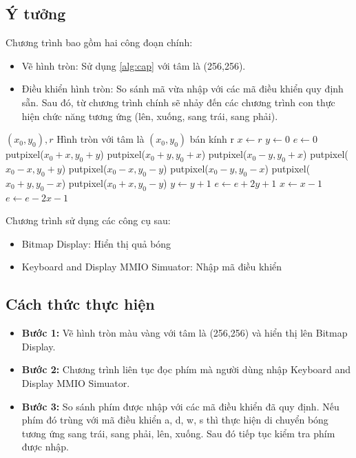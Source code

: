\documentclass[a4paper,12pt]{article}
\newenvironment{varalgorithm}[1]
  {\algorithm\renewcommand{\thealgorithm}{#1}}
  {\endalgorithm}
\begin{document}
	\subsection{Ý tưởng}
	Chương trình bao gồm hai công đoạn chính:
	\begin{itemize}
	    \item Vẽ hình tròn: Sử dụng \ref{alg:cap} với tâm là (256,256).
	    \item Điều khiển hình tròn: So sánh mã vừa nhập với các mã điều khiển quy định sẵn. Sau đó, từ chương trình chính sẽ nhảy đến các chương trình con thực hiện chức năng tương ứng (lên, xuống, sang trái, sang phải).
	\end{itemize}
	\begin{varalgorithm}{thuật toán Midpoint Circle}
	\caption{}
    \label{alg:cap}
    \begin{algorithmic}
    \Require $(x_0,y_0), r$
    \Ensure Hình tròn với tâm là $(x_0,y_0)$ bán kính r
    \State $x \gets r$
    \State $y \gets 0$
    \State $e \gets 0$
    \State putpixel($x_0+x,y_0+y$)
    \State putpixel($x_0+y,y_0+x$)
    \State putpixel($x_0-y,y_0+x$)
    \State putpixel($x_0-x,y_0+y$)
    \State putpixel($x_0-x,y_0-y$)
    \State putpixel($x_0-y,y_0-x$)
    \State putpixel($x_0+y,y_0-x$)
    \State putpixel($x_0+x,y_0-y$)
        \State $y \gets y + 1$
        \State $e \gets e + 2y + 1$
    \Else
        \State $x \gets x - 1$
        \State $e \gets e - 2x - 1$
    \EndIf
    \EndWhile
    \end{algorithmic}
    \end{varalgorithm}
    Chương trình sử dụng các công cụ sau:
	\begin{itemize}
	    \item Bitmap Display: Hiển thị quả bóng
	    \item Keyboard and Display MMIO Simuator: Nhập mã điều khiển
	\end{itemize}
    \clearpage
    \subsection{Cách thức thực hiện}
    \begin{itemize}
        \item \textbf{Bước 1:} Vẽ hình tròn màu vàng với tâm là (256,256) và hiển thị lên Bitmap Display.
        \item \textbf{Bước 2:} Chương trình liên tục đọc phím mà người dùng nhập Keyboard and Display MMIO Simuator.
        \item \textbf{Bước 3:} So sánh phím được nhập với các mã điều khiển đã quy định. Nếu phím đó trùng với mã điều khiển a, d, w, s thì thực hiện di chuyển bóng tương ứng sang trái, sang phải, lên, xuống. Sau đó tiếp tục kiểm tra phím được nhập. 
    \end{itemize}
    
\end{document}
